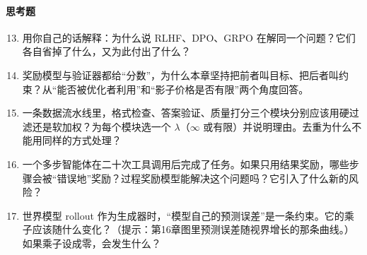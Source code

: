 \paragraph{思考题}
\begin{enumerate}
    \setcounter{enumi}{12}
    \item 用你自己的话解释：为什么说 RLHF、DPO、GRPO 在解同一个问题？它们各自省掉了什么，又为此付出了什么？

    \item 奖励模型与验证器都给“分数”，为什么本章坚持把前者叫目标、把后者叫约束？从“能否被优化者利用”和“影子价格是否有限”两个角度回答。

    \item 一条数据流水线里，格式检查、答案验证、质量打分三个模块分别应该用硬过滤还是软加权？为每个模块选一个 $\lambda$（$\infty$ 或有限）并说明理由。去重为什么不能用同样的方式处理？

    \item 一个多步智能体在二十次工具调用后完成了任务。如果只用结果奖励，哪些步骤会被“错误地”奖励？过程奖励模型能解决这个问题吗？它引入了什么新的风险？

    \item 世界模型 rollout 作为生成器时，“模型自己的预测误差”是一条约束。它的乘子应该随什么变化？（提示：第16章图里预测误差随视界增长的那条曲线。）如果乘子设成零，会发生什么？
\end{enumerate}
